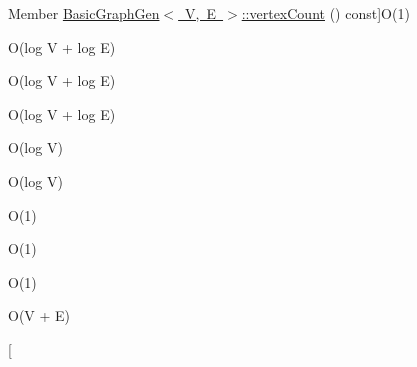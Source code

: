 \begin{DoxyRefList}
%
Member \mbox{\hyperlink{classBasicGraphGen_a68eb4830a4800ed7704895c16a8982be}{Basic\+Graph\+Gen$<$ V, E $>$\+:\+:vertex\+Count}} () const]O(1)  
\item[\label{BigOh__BigOh000042}%
\Hypertarget{BigOh__BigOh000042}%
Member \mbox{\hyperlink{classGraph_aad2e9fedd7110ae2fb6873c5e2d29941}{Graph$<$ Node\+Type, Arc\+Type $>$\+:\+:add\+Arc}} (const std\+::string \&n1, const std\+::string \&n2)]O(log V + log E)  
\item[\label{BigOh__BigOh000043}%
\Hypertarget{BigOh__BigOh000043}%
Member \mbox{\hyperlink{classGraph_a7280d3cd76bab82df392ba91ed5257c6}{Graph$<$ Node\+Type, Arc\+Type $>$\+:\+:add\+Arc}} (Node\+Type $\ast$n1, Node\+Type $\ast$n2)]O(log V + log E)  
\item[\label{BigOh__BigOh000044}%
\Hypertarget{BigOh__BigOh000044}%
Member \mbox{\hyperlink{classGraph_aa1b6553e579c03260253a2d731668dfa}{Graph$<$ Node\+Type, Arc\+Type $>$\+:\+:add\+Arc}} (Arc\+Type $\ast$arc)]O(log V + log E)  
\item[\label{BigOh__BigOh000045}%
\Hypertarget{BigOh__BigOh000045}%
Member \mbox{\hyperlink{classGraph_acd763aa09491315536b5d2734cd82b89}{Graph$<$ Node\+Type, Arc\+Type $>$\+:\+:add\+Node}} (const std\+::string \&name)]O(log V)  
\item[\label{BigOh__BigOh000046}%
\Hypertarget{BigOh__BigOh000046}%
Member \mbox{\hyperlink{classGraph_a635fa78d72315816cef6c091acfa3882}{Graph$<$ Node\+Type, Arc\+Type $>$\+:\+:add\+Node}} (Node\+Type $\ast$node)]O(log V)  
\item[\label{BigOh__BigOh000047}%
\Hypertarget{BigOh__BigOh000047}%
Member \mbox{\hyperlink{classGraph_ac0b108b3354f5222d2c829dcd639fa7a}{Graph$<$ Node\+Type, Arc\+Type $>$\+:\+:arc\+Count}} () const]O(1)  
\item[\label{BigOh__BigOh000048}%
\Hypertarget{BigOh__BigOh000048}%
Member \mbox{\hyperlink{classGraph_a27d59ef129bb56cc144ecc81c0affd34}{Graph$<$ Node\+Type, Arc\+Type $>$\+:\+:back}} () const]O(1)  
\item[\label{BigOh__BigOh000091}%
\Hypertarget{BigOh__BigOh000091}%
Member \mbox{\hyperlink{classGraph_aea3a8950c46f4ac913207201b685e715}{Graph$<$ Node\+Type, Arc\+Type $>$\+:\+:begin}} () const]O(1)  
\item[\label{BigOh__BigOh000049}%
\Hypertarget{BigOh__BigOh000049}%
Member \mbox{\hyperlink{classGraph_ac8bb3912a3ce86b15842e79d0b421204}{Graph$<$ Node\+Type, Arc\+Type $>$\+:\+:clear}} ()]O(V + E)  
\item[\label{BigOh__BigOh000050}%

\end{DoxyRefList}
